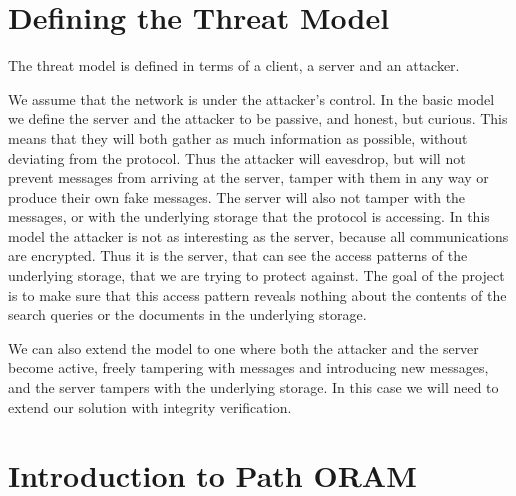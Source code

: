 \documentclass[12pt,a4paper,twoside,openright]{report}
\begin{document}






\section{Defining the Threat Model}
\label{sec:threatmodel}

The threat model is defined in terms of a client, a server and an attacker.

\setlength{\unitlength}{0.67mm}

\setlength{\unitlength}{0.5mm}

We assume that the network is under the attacker's control. In the basic model we define the server and the attacker to be passive, and honest, but curious. This means that they will both gather as much information as possible, without deviating from the protocol. Thus the attacker will eavesdrop, but will not prevent messages from arriving at the server, tamper with them in any way or produce their own fake messages. The server will also not tamper with the messages, or with the underlying storage that the protocol is accessing. In this model the attacker is not as interesting as the server, because all communications are encrypted. Thus it is the server, that can see the access patterns of the underlying storage, that we are trying to protect against. The goal of the project is to make sure that this access pattern reveals nothing about the contents of the search queries or the documents in the underlying storage.

We can also extend the model to one where both the attacker and the server become active, freely tampering with messages and introducing new messages, and the server tampers with the underlying storage. In this case we will need to extend our solution with integrity verification.

\section{Introduction to Path ORAM}
\label{sec:oramintro}
\end{document}
